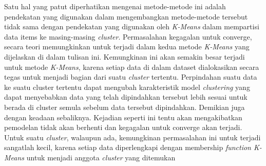 \par Satu hal yang patut diperhatikan mengenai metode-metode ini adalah pendekatan yang digunakan dalam mengembangkan metode-metode tersebut tidak sama dengan pendekatan yang digunakan oleh \textit{K-Means} dalam mempartisi data items ke masing-masing \textit{cluster}. Permasalahan kegagalan untuk converge, secara teori memungkinkan untuk terjadi dalam kedua metode \textit{K-Means} yang dijelaskan di dalam tulisan ini. Kemungkinan ini akan semakin besar terjadi untuk metode  \textit{K-Means}, karena setiap data di dalam dataset dialokasikan secara tegas  untuk menjadi bagian dari suatu \textit{cluster} tertentu. Perpindahan suatu data ke suatu cluster tertentu dapat mengubah karakteristik model \textit{clustering} yang dapat menyebabkan data yang telah dipindahkan tersebut lebih sesuai untuk berada di cluster semula sebelum data tersebut dipindahkan. Demikian juga dengan keadaan sebaliknya. Kejadian seperti ini tentu akan mengakibatkan pemodelan tidak akan berhenti dan kegagalan untuk converge akan terjadi. Untuk suatu \textit{cluster}, walaupun ada, kemungkinan permasalahan ini untuk terjadi sangatlah kecil, karena setiap data diperlengkapi dengan membership \textit{function K-Means} untuk menjadi anggota \textit{cluster} yang ditemukan \cite{setyawan2018comparison}
